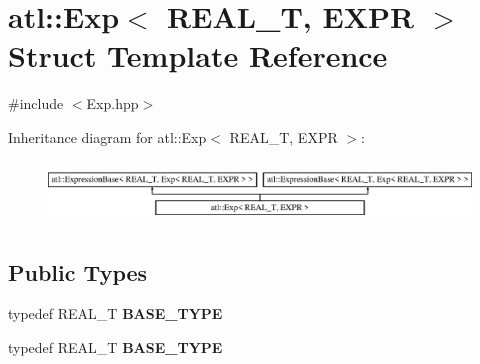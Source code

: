 \hypertarget{structatl_1_1_exp}{\section{atl\+:\+:Exp$<$ R\+E\+A\+L\+\_\+\+T, E\+X\+P\+R $>$ Struct Template Reference}
\label{structatl_1_1_exp}
}


{\ttfamily \#include $<$Exp.\+hpp$>$}

Inheritance diagram for atl\+:\+:Exp$<$ R\+E\+A\+L\+\_\+\+T, E\+X\+P\+R $>$\+:\begin{figure}[H]
\begin{center}
\leavevmode
\includegraphics[height=1.642229cm]{structatl_1_1_exp}
\end{center}
\end{figure}
\subsection*{Public Types}
\begin{DoxyCompactItemize}
\item 
\hypertarget{structatl_1_1_exp_a4b49fa63f7f2432f0aa3927aec1aff73}{typedef R\+E\+A\+L\+\_\+\+T {\bfseries B\+A\+S\+E\+\_\+\+T\+Y\+P\+E}}\label{structatl_1_1_exp_a4b49fa63f7f2432f0aa3927aec1aff73}

\item 
\hypertarget{structatl_1_1_exp_a4b49fa63f7f2432f0aa3927aec1aff73}{typedef R\+E\+A\+L\+\_\+\+T {\bfseries B\+A\+S\+E\+\_\+\+T\+Y\+P\+E}}\label{structatl_1_1_exp_a4b49fa63f7f2432f0aa3927aec1aff73}

\end{DoxyCompactItemize}
